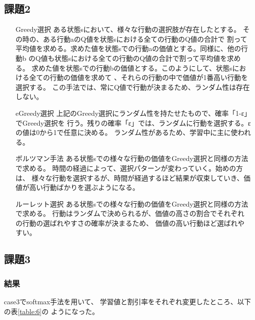 \subsection{課題2}
\begin{itemize}
  \setlength{\leftskip}{2.0cm}
  \item[Greedy選択] ある状態sにおいて、様々な行動の選択肢が存在したとする。
  その時の、ある行動aのQ値を状態sにおける全ての行動のQ値の合計で
  割って平均値を求める。求めた値を状態sでの行動aの価値とする。同様に、他の行動b
  のQ値も状態sにおける全ての行動のQ値の合計で割って平均値を求める。
  求めた値を状態sでの行動bの価値とする。このようにして、状態sにおける全ての行動の価値を求めて
  、それらの行動の中で価値が1番高い行動を選択する。
  この手法では、常にQ値で行動が決まるため、ランダム性は存在しない。\cite{url1}
  \item[eGreedy選択] 上記のGreedy選択にランダム性を持たせたもので、確率「1-ε」でGreedy選択を
  行う。残りの確率「ε」では、ランダムに行動を選択する。εの値は0から1で任意に決める。
  ランダム性があるため、学習中に主に使われる。\cite{url1}
  \item[ボルツマン手法] ある状態sでの様々な行動の価値をGreedy選択と同様の方法で求める。
  時間の経過によって、選択パターンが変わっていく。始めの方は、
  様々な行動を選択するが、時間が経過するほど結果が収束していき、価値が高い行動ばかりを選ぶようになる。\cite{url1}
  \item[ルーレット選択] ある状態sでの様々な行動の価値をGreedy選択と同様の方法で求める。
  行動はランダムで決められるが、価値の高さの割合でそれぞれの行動の選ばれやすさの確率が決まるため、
  価値の高い行動ほど選ばれやすい。\cite{url1}
\end{itemize}


\clearpage
\subsection{課題3}
\subsubsection{結果}
case3でsoftmax手法を用いて、
学習値と割引率をそれぞれ変更したところ、以下の表\ref{table:6}の
ようになった。

